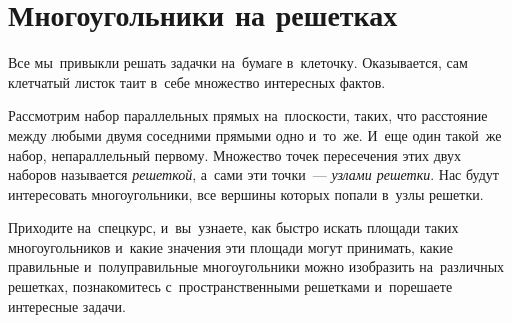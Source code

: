 
\section*{Многоугольники на решетках}



Все мы~привыкли решать задачки на~бумаге в~клеточку.
Оказывается, сам клетчатый листок таит в~себе множество интересных фактов.

Рассмотрим набор параллельных прямых на~плоскости, таких, что расстояние между
любыми двумя соседними прямыми одно и~то~же.
И~еще один такой~же набор, непараллельный первому.
Множество точек пересечения этих двух наборов называется \emph{решеткой},
а~сами эти точки~--- \emph{узлами решетки}.
Нас будут интересовать многоугольники, все вершины которых попали в~узлы
решетки.

Приходите на~спецкурс, и~вы~узнаете, как быстро искать площади таких
многоугольников и~какие значения эти площади могут принимать, какие правильные
и~полуправильные многоугольники можно изобразить на~различных решетках,
познакомитесь с~пространственными решетками и~порешаете интересные задачи.

\bigskip

\begin{center}
\end{center}

